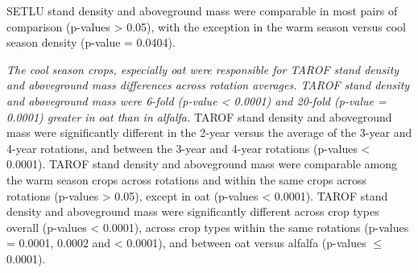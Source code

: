 \documentclass[
]{article}
\begin{document}
SETLU stand density and aboveground mass were comparable in most pairs of comparison (p-values \textgreater{} 0.05), with the exception in the warm season versus cool season density (p-value = 0.0404).

\emph{The cool season crops, especially oat were responsible for TAROF stand density and aboveground mass differences across rotation averages. TAROF stand density and aboveground mass were 6-fold (p-value \textless{} 0.0001) and 20-fold (p-value = 0.0001) greater in oat than in alfalfa.} TAROF stand density and aboveground mass were significantly different in the 2-year versus the average of the 3-year and 4-year rotations, and between the 3-year and 4-year rotations (p-values \textless{} 0.0001). TAROF stand density and aboveground mass were comparable among the warm season crops across rotations and within the same crops across rotations (p-values \textgreater{} 0.05), except in oat (p-values \textless{} 0.0001). TAROF stand density and aboveground mass were significantly different across crop types overall (p-values \textless{} 0.0001), across crop types within the same rotations (p-values = 0.0001, 0.0002 and \textless{} 0.0001), and between oat versus alfalfa (p-values \(\leq\) 0.0001).
\end{document}
